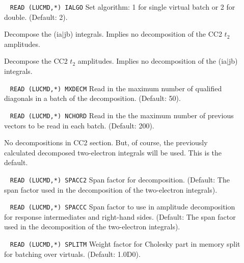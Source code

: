 \begin{description}
\item[]\verb| |\newline
\verb|READ (LUCMD,*) IALGO|\newline
        Set algorithm: 1 for single virtual batch or 2 for 
        double. (Default: 2).
%
\item[] 
        Decompose the (ia$\mid$jb) integrals. Implies no decomposition
        of the CC2 $t_{2}$ amplitudes.
%
\item[] 
        Decompose the CC2 $t_{2}$ amplitudes. Implies no decomposition
        of the (ia$\mid$jb) integrals.
%
\item[] \verb| |\newline
\verb|READ (LUCMD,*) MXDECM|\newline
        Read in the maximum number of qualified diagonals in a 
        batch of the decomposition. (Default: 50).
%
\item[] \verb| |\newline
\verb|READ (LUCMD,*) NCHORD|\newline
        Read in the the maximum number of previous vectors
        to be read in each batch. (Default: 200).
%
\item[] 
        No decompositions in CC2 section. But, of course,
        the previously calculated decomposed two-electron integrals
        will be used. This is the default.
%
\item[] \verb| |\newline
\verb|READ (LUCMD,*) SPACC2|\newline
        Span factor for decomposition. (Default: 
        The span factor used in the decomposition of
        the two-electron integrals).
%
\item[] \verb| |\newline
\verb|READ (LUCMD,*) SPACCC|\newline
        Span factor to use in amplitude decomposition for
        response intermediates and right-hand sides. (Default: 
        The span factor used in the decomposition of
        the two-electron integrals).
%
\item[] \verb| |\newline
\verb|READ (LUCMD,*) SPLITM|\newline
        Weight factor for Cholesky part in memory split for
        batching over virtuals. (Default: 1.0D0).
%
\item[] \verb| |\newline

\end{description}
